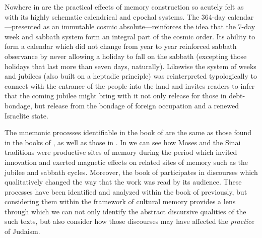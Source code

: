 Nowhere in \jub are the practical effects of memory construction so acutely felt as with its highly schematic calendrical and epochal systems. The 364-day calendar---presented as an immutable cosmic absolute---reinforces the idea that the 7-day week and sabbath system form an integral part of the cosmic order.%
    \autocite{fraade_dine-israel2010}
Its ability to form a calendar which did not change from year to year reinforced sabbath observance by never allowing a holiday to fall on the sabbath (excepting those holidays that last more than seven days, naturally). Likewise the system of weeks and jubilees (also built on a heptadic principle) was reinterpreted typologically to connect with the entrance of the people into the land and invites readers to infer that the coming jubilee might bring with it not only release for those in debt-bondage, but release from the bondage of foreign occupation and a renewed Israelite state.

The mnemonic processes identifiable in the book of \jub are the same as those found in the books of \chronicles, as well as those in \ga. In \jub we can see how Moses and the Sinai traditions were productive sites of memory during the \secondtemple period which invited innovation and exerted magnetic effects on related sites of memory such as the jubilee and sabbath cycles. Moreover, the book of \jub participates in \psgraphical discourses which qualitatively changed the way that the work was read by its audience. These processes have been identified and analyzed within the book of \jub previously, but considering them within the framework of cultural memory provides a lens through which we can not only identify the abstract discursive qualities of the such texts, but also consider how those discourses may have affected the \emph{practice} of \secondtemple Judaism.